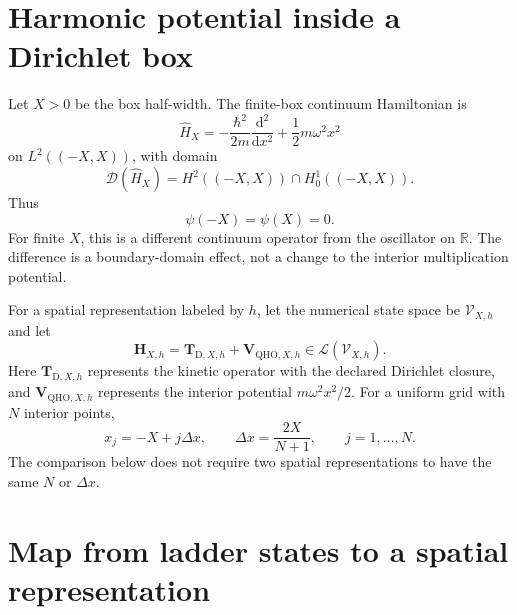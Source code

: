 
\section{Harmonic potential inside a Dirichlet box}


Let $X>0$ be the box half-width. The finite-box continuum Hamiltonian is
\begin{equation}
    \hat H_X
    =
    -\frac{\hbar^2}{2m}
    \frac{\mathrm{d}^2}{\mathrm{d}x^2}
    +
    \frac{1}{2}m\omega^2x^2
\end{equation}
on $L^2((-X,X))$, with domain
\begin{equation}
    \mathcal D(\hat H_X)
    =
    H^2((-X,X))\cap H_0^1((-X,X)).
\end{equation}
Thus
\begin{equation}
    \psi(-X)=\psi(X)=0.
\end{equation}
For finite $X$, this is a different continuum operator from the oscillator on
$\mathbb R$. The difference is a boundary-domain effect, not a change to the
interior multiplication potential.

For a spatial representation labeled by $h$, let the numerical state space be
$\mathcal V_{X,h}$ and let
\begin{equation}
    \mathbf H_{X,h}
    =
    \mathbf T_{\mathrm D,X,h}
    +
    \mathbf V_{\mathrm{QHO},X,h}
    \in
    \mathcal L(\mathcal V_{X,h}).
\end{equation}
Here $\mathbf T_{\mathrm D,X,h}$ represents the kinetic operator with the
declared Dirichlet closure, and $\mathbf V_{\mathrm{QHO},X,h}$ represents the
interior potential $m\omega^2x^2/2$. For a uniform grid with $N$ interior
points,
\begin{equation}
    x_j=-X+j\Delta x,
    \qquad
    \Delta x=\frac{2X}{N+1},
    \qquad
    j=1,\ldots,N.
\end{equation}
The comparison below does not require two spatial representations to have the
same $N$ or $\Delta x$.

\section{Map from ladder states to a spatial representation}

